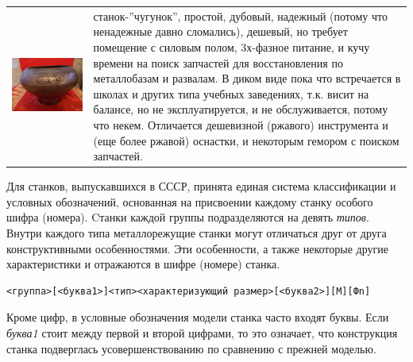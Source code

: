 
\begin{tabular}{p{} p{}}
\includegraphics[height=0.3\textheight]{stanki/chugunok.jpg}
&
станок-''чугунок'', простой, дубовый, надежный (потому что ненадежные давно
сломались), дешевый, но требует помещение с силовым полом, 3х-фазное питание, и
кучу времени на поиск запчастей для восстановления по металлобазам и развалам. В
диком виде пока что встречается в школах и других типа учебных заведениях, т.к.
висит на балансе, но не эксплуатируется, и не обслуживается, потому что некем.
Отличается дешевизной (ржавого) инструмента и (еще более ржавой) оснастки, и
некоторым гемором с поиском запчастей.
\\
\end{tabular}
\clearpage


Для станков, выпускавшихся в СССР, принята единая система классификации и
условных обозначений, основанная на присвоении каждому станку особого шифра
(номера). Cтанки каждой группы подразделяются на девять \emph{типов}.
Внутри каждого типа металлорежущие станки могут отличаться друг от друга
конструктивными особенностями. Эти особенности, а также некоторые другие
характеристики и отражаются в шифре (номере) станка.

\begin{verbatim}
<группа>[<буква1>]<тип><характеризующий размер>[<буква2>][M][Фn]
\end{verbatim}

Кроме цифр, в условные обозначения модели станка часто входят буквы. Если
\emph{буква1} стоит между первой и второй цифрами, то это означает, что
конструкция станка подверглась усовершенствованию по сравнению с прежней
моделью. 

